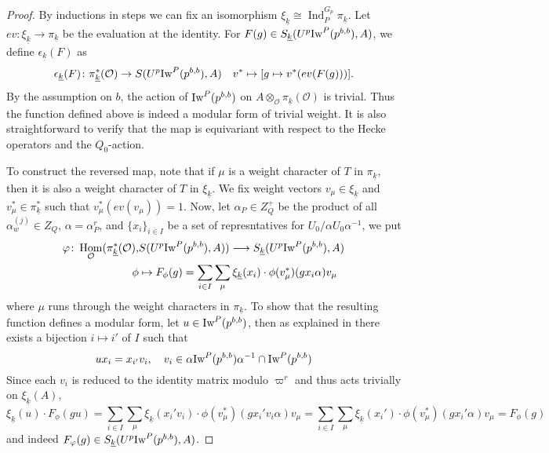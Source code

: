 \documentclass[leqno]{amsart}
\newcommand{\wt}[1]{\underline{ #1 }}
\newcommand{\Iw}{\textnormal{Iw}}
\newcommand{\oo}{\mathcal{O}} %
\DeclareMathOperator{\Hom}{Hom}
\DeclareMathOperator{\Ind}{Ind}
\theoremstyle{definition}
\theoremstyle{remark}
\begin{document}
\begin{proof}
	By inductions in steps
	we can fix an isomorphism 
	$\xi_{\wt{k}}\cong \Ind_{P}^{G_p}\pi_{\wt{k}}$.
	Let $ev\colon \xi_{\wt{k}}\to \pi_{\wt{k}}$
	be the evaluation at the identity.
	For $F(g)\in S_{\wt{k}}(U^p\Iw^P(p^{b,b}),A)$,
	we define 
	$\epsilon_{\wt{k}}(F)$ as 
	\begin{equation}\label{eq:wt_indep}
	\epsilon_{\wt{k}}(F)\colon 
	\pi^*_{\wt{k}}(\oo)\rightarrow
	S(U^p\Iw^P(p^{b,b}),A)\quad
	v^*\mapsto [g\mapsto v^*(ev(F(g)))].
	\end{equation}
	By the assumption on $b$,
	the action of $\Iw^P(p^{b,b})$ on 
	$A\otimes_{\oo}\pi_{\wt{k}}(\oo)$
	is trivial.
	Thus the function defined above is indeed 
	a modular form
	of trivial weight.
	It is also straightforward to verify
	that the map is equivariant with respect
	to the Hecke operators and the $Q_0$-action.


	To construct the reversed map,
	note that if $\mu$ is a weight character of $T$ in  
	$\pi_{\wt{k}}$, then it is also a weight character 
	of $T$ in $\xi_{\wt{k}}$.
	We fix weight vectors $v_\mu\in \xi_{\wt{k}}$
	and $v^*_\mu\in \pi_{\wt{k}}^*$
	such that $v^*_{\mu}(ev(v_\mu))=1$.
	Now, let $\alpha_P\in Z_Q^+$ be the product
	of all $\alpha_w^{(j)}\in Z_Q$, $\alpha=\alpha_P^r$,
	and $\{x_i\}_{i\in I}$
	be a set of represntatives 
	for $U_0/\alpha U_0\alpha^{-1}$,
	we put 
	\begin{align*}
		\varphi\colon 
		\Hom_{\oo}(\pi_{\wt{k}}^*(\oo),&
		S(U^p\Iw^P(p^{b,b}),A))\longrightarrow
		S_{\wt{k}}(U^p\Iw^P(p^{b,b}),A)\\
		\phi&\mapsto 
		F_\phi(g)=\sum_{i\in I} \sum_{\mu}
		\xi_{\wt{k}}(x_i)\cdot 
		\phi(v^*_\mu)(gx_i\alpha)v_\mu
	\end{align*}
	where $\mu$ runs through the weight characters in 
	$\pi_{\wt{k}}$.
	To show that the resulting function 
	defines a modular form,
	let $u\in \Iw^P(p^{b,b})$, 
	then as explained in \cite[Prop 2.22]{ger}
	there exists a bijection $i\mapsto i'$ of $I$
	such that 
	 \[
		ux_i=x_{i'}v_i,\quad
		v_i\in\alpha\Iw^P(p^{b,b})\alpha^{-1} 
		\cap \Iw^P(p^{b,b})
	\]
	Since each $v_i$ is reduced to the identity matrix 
	modulo $\varpi^r$ and thus acts trivially on 
	$\xi_{\wt{k}}(A)$,
	\[
		\xi_{\wt{k}}(u)\cdot F_\phi(gu)=
		\sum_{i\in I}\sum_{\mu}
		\xi_{\wt{k}}(x_i'v_i)\cdot 
		\phi(v^*_\mu)(gx_i'v_i\alpha)v_\mu=
		\sum_{i\in I}\sum_{\mu}
		\xi_{\wt{k}}(x_i')\cdot 
		\phi(v^*_\mu)(gx_i'\alpha)v_\mu=F_\phi(g)
	\]
	and indeed $F_\varphi(g)\in 
	S_{\wt{k}}(U^p\Iw^P(p^{b,b}),A)$.


\end{proof}
\end{document}

